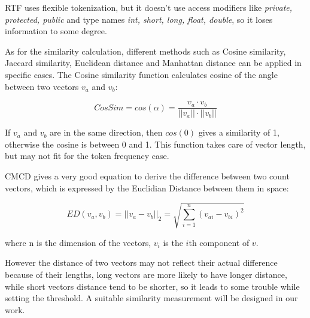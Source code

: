 \documentclass[../main.tex]{subfiles}
\begin{document}
RTF uses flexible tokenization, but it doesn't use access modifiers like \emph{private, protected, public} and type names \emph{int, short, long, float, double}, so it loses information to some degree.

As for the similarity calculation, different methods such as Cosine similarity, Jaccard similarity, Euclidean distance and Manhattan distance can be applied in specific cases.
The Cosine similarity function calculates cosine of the angle between two vectors $v_a$ and $v_b$:

\begin{equation}
CosSim = cos(\alpha) = \frac{v_a \cdot v_b}{||v_a|| \cdot ||v_b||} \nonumber
\end{equation}

If $v_a$ and $v_b$ are in the same direction, then $cos(0)$ gives a similarity of 1, otherwise the cosine is between 0 and 1. This function takes care of vector length, but may not fit for the token frequency case. 

CMCD gives a very good equation to derive the difference between two count vectors, which is expressed by the Euclidian Distance between them in space:

\begin{equation}
ED(v_a, v_b) = ||v_a - v_b||_2 = \sqrt{\sum_{i=1}^n(v_{ai} - v_{bi})^2} \nonumber
\end{equation}

where n is the dimension of the vectors, $v_i$ is the $i$th component of $v$.

However the distance of two vectors may not reflect their actual difference because of their lengths, long vectors are more likely to have longer distance, while short vectors distance tend to be shorter, so it leads to some trouble while setting the threshold. A suitable similarity measurement will be designed in our work.
\end{document}
